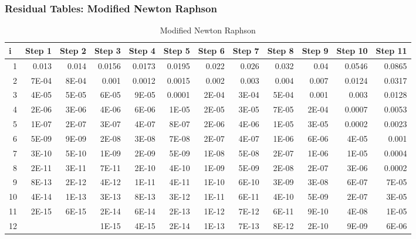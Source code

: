 \documentclass[11pt]{article}
\begin{document}
\subsubsection*{Residual Tables: Modified Newton Raphson}
\begin{table}[htbp]
  \centering
  \caption{Modified Newton Raphson}
    \begin{tabular}{rrrrrrrrrrrr}
    \toprule
    \multicolumn{1}{l}{\textbf{i}} & \multicolumn{1}{l}{\textbf{Step 1}} & \multicolumn{1}{l}{\textbf{Step 2}} & \multicolumn{1}{l}{\textbf{Step 3}} & \multicolumn{1}{l}{\textbf{Step 4}} & \multicolumn{1}{l}{\textbf{Step 5}} & \multicolumn{1}{l}{\textbf{Step 6}} & \multicolumn{1}{l}{\textbf{Step 7}} & \multicolumn{1}{l}{\textbf{Step 8}} & \multicolumn{1}{l}{\textbf{Step 9}} & \multicolumn{1}{l}{\textbf{Step 10}} & \multicolumn{1}{l}{\textbf{Step 11}} \\
    \midrule
    1     & 0.013 & 0.014 & 0.0156 & 0.0173 & 0.0195 & 0.022 & 0.026 & 0.032 & 0.04  & 0.0546 & 0.0865 \\
    2     & 7E-04 & 8E-04 & 0.001 & 0.0012 & 0.0015 & 0.002 & 0.003 & 0.004 & 0.007 & 0.0124 & 0.0317 \\
    3     & 4E-05 & 5E-05 & 6E-05 & 9E-05 & 0.0001 & 2E-04 & 3E-04 & 5E-04 & 0.001 & 0.003 & 0.0128 \\
    4     & 2E-06 & 3E-06 & 4E-06 & 6E-06 & 1E-05 & 2E-05 & 3E-05 & 7E-05 & 2E-04 & 0.0007 & 0.0053 \\
    5     & 1E-07 & 2E-07 & 3E-07 & 4E-07 & 8E-07 & 2E-06 & 4E-06 & 1E-05 & 3E-05 & 0.0002 & 0.0023 \\
    6     & 5E-09 & 9E-09 & 2E-08 & 3E-08 & 7E-08 & 2E-07 & 4E-07 & 1E-06 & 6E-06 & 4E-05 & 0.001 \\
    7     & 3E-10 & 5E-10 & 1E-09 & 2E-09 & 5E-09 & 1E-08 & 5E-08 & 2E-07 & 1E-06 & 1E-05 & 0.0004 \\
    8     & 2E-11 & 3E-11 & 7E-11 & 2E-10 & 4E-10 & 1E-09 & 5E-09 & 2E-08 & 2E-07 & 3E-06 & 0.0002 \\
    9     & 8E-13 & 2E-12 & 4E-12 & 1E-11 & 4E-11 & 1E-10 & 6E-10 & 3E-09 & 3E-08 & 6E-07 & 7E-05 \\
    10    & 4E-14 & 1E-13 & 3E-13 & 8E-13 & 3E-12 & 1E-11 & 6E-11 & 4E-10 & 5E-09 & 2E-07 & 3E-05 \\
    11    & 2E-15 & 6E-15 & 2E-14 & 6E-14 & 2E-13 & 1E-12 & 7E-12 & 6E-11 & 9E-10 & 4E-08 & 1E-05 \\
    12    &       &       & 1E-15 & 4E-15 & 2E-14 & 1E-13 & 7E-13 & 8E-12 & 2E-10 & 9E-09 & 6E-06 \\

\end{tabular}
\end{table}
\end{document}
